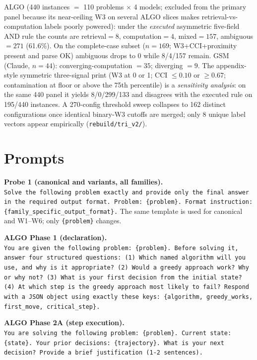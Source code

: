 ALGO (440 instances ${=}$ 110 problems $\times$ 4 models; \omini{} excluded
from the primary panel because its near-ceiling W3 on several ALGO slices
makes retrieval-vs-computation labels poorly powered): under the
\emph{executed} asymmetric five-field AND rule the counts are retrieval${=}8$,
computation${=}4$, mixed${=}157$, ambiguous${=}271$ (61.6\%). On the
complete-case subset ($n{=}169$; W3+CCI+proximity present and parse OK)
ambiguous drops to 0 while 8/4/157 remain. GSM (Claude, $n{=}44$):
converging-computation ${=}35$; diverging ${=}9$. The appendix-style
symmetric three-signal print (W3 at 0 or 1; CCI $\leq 0.10$ or
$\geq 0.67$; contamination at floor or above the 75th percentile) is a
\emph{sensitivity analysis}: on the same 440 panel it yields 8/0/299/133 and
disagrees with the executed rule on 195/440 instances. A 270-config threshold
sweep collapses to 162 distinct configurations once identical binary-W3
cutoffs are merged; only 8 unique label vectors appear empirically
(\texttt{rebuild/tri\_v2/}).



\section{Prompts}
\label{app:prompts}

\textbf{Probe 1 (canonical and variants, all families).}\\
\texttt{Solve the following problem exactly and provide only the final answer
in the required output format. Problem: \{problem\}. Format instruction:
\{family\_specific\_output\_format\}.} The same template is used for canonical
and W1--W6; only \texttt{\{problem\}} changes.

\textbf{ALGO Phase 1 (declaration).}\\
\texttt{You are given the following problem: \{problem\}. Before solving it,
answer four structured questions: (1) Which named algorithm will you use, and
why is it appropriate? (2) Would a greedy approach work? Why or why not? (3)
What is your first decision from the initial state? (4) At which step is the
greedy approach most likely to fail? Respond with a JSON object using exactly
these keys: \{algorithm, greedy\_works, first\_move, critical\_step\}.}

\textbf{ALGO Phase 2A (step execution).}\\
\texttt{You are solving the following problem: \{problem\}. Current state:
\{state\}. Your prior decisions: \{trajectory\}. What is your next decision?
Provide a brief justification (1{-}2 sentences).}

